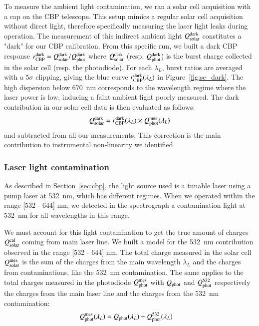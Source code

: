 To measure the ambient light contamination, we ran a solar cell acquisition with a cap on the CBP telescope. This setup mimics a regular solar cell acquisition without direct light, therefore specifically measuring the laser light leaks during operation. The measurement of this indirect ambient light $Q_{\mathrm{solar}}^{\rm dark}$ constitutes a "dark" for our CBP calibration. From this specific run, we built a dark CBP response $r_{\mathrm{CBP}}^{\rm dark} = Q_{\mathrm{solar}}^{\rm dark} / Q_{\mathrm{phot}}^{\rm dark}$ where $Q_{\mathrm{solar}}^{\rm dark}$ (resp. $Q_{\mathrm{phot}}^{\rm dark}$) is the burst charge collected in the solar cell (resp. the photodiode). For each $\lambda_L$, burst ratios are averaged with a $5\sigma$ clipping, giving the blue curve $r_{\mathrm{CBP}}^{\rm dark}(\lambda_L)$ in Figure~\ref{fig:sc_dark}. The high dispersion below \SI{670}{\nano\meter} corresponds to the wavelength regime where the laser power is low, inducing a faint ambient light poorly measured. The dark contribution in our solar cell data is then evaluated as follows:
\begin{equation}
    Q_{\mathrm{solar}}^{\rm dark} = r_{\mathrm{CBP}}^{\rm dark}(\lambda_L) \times Q_{\mathrm{phot}}^{\mathrm{mes}}(\lambda_L)
\end{equation}
and subtracted from all our measurements. This correction is the main contribution to instrumental non-linearity we identified. 


\subsubsection{Laser light contamination}
\label{sec:532_cont}

As described in Section~\ref{sec:cbp}, the light source used is a tunable laser using a pump laser at \SI{532}{\nano\meter}, which has different regimes. When we operated within the range [532 - 644] nm, we detected in the spectrograph a contamination light at \SI{532}{\nano\meter} for all wavelengths in this range. 

We must account for this light contamination to get the true amount of charges $Q_{\mathrm{solar}}^{\mathrm{cal}}$ coming from main laser line. We built a model for the \SI{532}{\nano\meter} contribution observed in the range [532 - 644] nm. The total charge measured in the solar cell $Q_{\mathrm{solar}}^{\mathrm{mes}}$ is the sum of the charges from the main wavelength $\lambda_L$ and the charges from contaminations, like the \SI{532}{\nm} contamination. The same applies to the total charges measured in the photodiode $Q_{\mathrm{phot}}^{\mathrm{mes}}$ with $Q_{\mathrm{phot}}$ and $Q_{\mathrm{phot}}^{532}$ respectively the charges from the main laser line and the charges from the \SI{532}{\nm} contamination:
\begin{align}
Q_{\mathrm{phot}}^{\mathrm{mes}}(\lambda_L) & = Q_{\mathrm{phot}}(\lambda_L) + Q_{\mathrm{phot}}^{532}(\lambda_L) \label{eq:qphot_mes}
\end{align}

